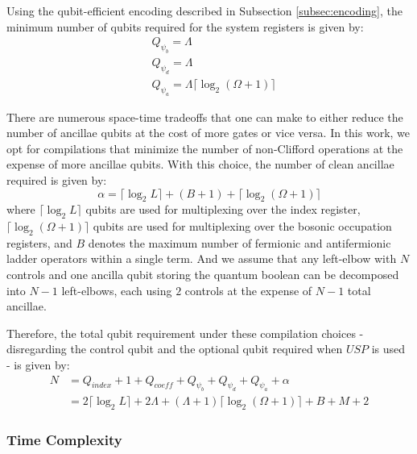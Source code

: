 Using the qubit-efficient encoding described in Subsection \ref{subsec:encoding}, the minimum number of qubits required for the system registers is given by:
\begin{equation}
    \begin{split}
        &Q_{\psi_b} = \Lambda \\
        &Q_{\psi_d} = \Lambda \\
        &Q_{\psi_a} = \Lambda \lceil \log_2{(\Omega + 1)} \rceil
    \end{split}
\end{equation} 

There are numerous space-time tradeoffs that one can make to either reduce the number of ancillae qubits at the cost of more gates or vice versa.
In this work, we opt for compilations that minimize the number of non-Clifford operations at the expense of more ancillae qubits.
With this choice, the number of clean ancillae required is given by:
\begin{equation}
    \alpha = \lceil \log_2{L} \rceil + (B + 1) + \lceil \log_2{(\Omega + 1)} \rceil
\end{equation}
where $\lceil \log_2{L} \rceil$ qubits are used for multiplexing over the index register, $ \lceil \log_2{(\Omega + 1)} \rceil$ qubits are used for multiplexing over the bosonic occupation registers, and $B$ denotes the maximum number of fermionic and antifermionic ladder operators within a single term.
And we assume that any left-elbow with $N$ controls and one ancilla qubit storing the quantum boolean can be decomposed into $N-1$ left-elbows, each using $2$ controls at the expense of $N-1$ total ancillae.

Therefore, the total qubit requirement under these compilation choices - disregarding the control qubit and the optional qubit required when $USP$ is used - is given by:
\begin{equation}
    \begin{split}
        N &= Q_{\textit{index}} + 1 + Q_{\textit{coeff}} + Q_{\psi_b} + Q_{\psi_d} + Q_{\psi_a} + \alpha \\
        &= 2 \lceil \log_2{L} \rceil + 2 \Lambda + (\Lambda + 1) \lceil \log_2{(\Omega + 1)} \rceil + B + M + 2
    \end{split}
\end{equation}


\subsubsection{Time Complexity}

